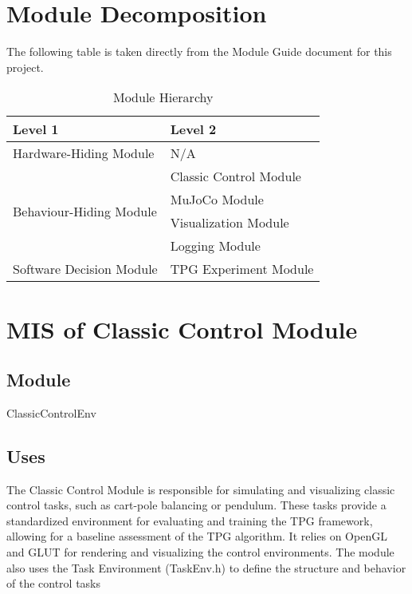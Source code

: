 \documentclass[12pt, titlepage]{article}
\begin{document}
\section{Module Decomposition}

The following table is taken directly from the Module Guide document for this project.

\begin{table}[h!]
  \centering
  \begin{tabular}{p{} p{}}
  \toprule
  \textbf{Level 1} & \textbf{Level 2}\\
  \midrule
  
  {Hardware-Hiding Module} & N/A \\
  \midrule
  
  \multirow{4}{0.3\textwidth}{Behaviour-Hiding Module} & Classic Control Module \\
  & MuJoCo Module\\
  & Visualization Module\\
  & Logging Module\\
  \midrule
  
  \multirow{1}{0.3\textwidth}{Software Decision Module} & {TPG Experiment Module}\\
  \bottomrule
  
  \end{tabular}
  \caption{Module Hierarchy}
  \label{TblMH}
  \end{table}

\section{MIS of Classic Control Module} \label{ClassicControl Module}

\subsection{Module}
ClassicControlEnv

\subsection{Uses}
The Classic Control Module is responsible for simulating and visualizing classic control tasks, such as cart-pole balancing or pendulum. These tasks provide a standardized environment for evaluating and training the TPG framework, allowing for a baseline assessment of the TPG algorithm. It relies on OpenGL and GLUT for rendering and visualizing the control environments. The module also uses the Task Environment (TaskEnv.h) to define the structure and behavior of the control tasks
\end{document}
